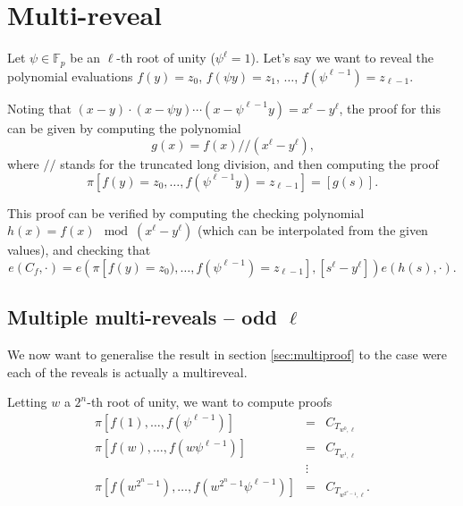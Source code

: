 \documentclass[a4paper]{article}
\begin{document}
\section{Multi-reveal}

Let $\psi\in\mathbb{F}_p$ be an $\ell$-th root of unity ($\psi^\ell=1$). Let's say we want to reveal the polynomial evaluations $f(y) = z_0$, $f(\psi y) = z_1$, $\ldots$, $f(\psi^{\ell-1})=z_{\ell - 1}$.

Noting that $(x-y)\cdot(x-\psi y) \cdots (x - \psi^{\ell-1} y) = x^\ell - y^\ell$, the proof for this can be given by computing the polynomial
\begin{equation}
g(x) = f(x) // (x^\ell - y^\ell)\text{,}
\end{equation}
where $//$ stands for the truncated long division, and then computing the proof
\begin{equation}
     \pi[f(y) = z_0, \ldots, f(\psi^{\ell-1}y)=z_{\ell - 1}] = [g(s)] \text{.}
\end{equation}

This proof can be verified by computing the checking polynomial $h(x) = f(x) \mod (x^\ell - y^\ell)$ (which can be interpolated from the given values), and checking that
\begin{equation}
e(C_f, \cdot) = e(\pi[f(y) = z_0), \ldots, f(\psi^{\ell-1})=z_{\ell - 1}], [s^\ell - y^\ell]) e(h(s),\cdot) \text{.}
\end{equation}

\subsection{Multiple multi-reveals -- odd $\ell$}

We now want to generalise the result in section \ref{sec:multiproof} to the case were each of the reveals is actually a multireveal.

Letting $w$ a $2^n$-th root of unity, we want to compute proofs
\begin{eqnarray}
     \pi[f(1), \ldots, f(\psi^{\ell-1})] &=& C_{T_{w^0, \ell}} \\
     \pi[f(w), \ldots, f(w\psi^{\ell-1})] &=& C_{T_{w^1, \ell}} \\
     &\vdots& \nonumber \\
     \pi[f(w^{2^n-1}), \ldots, f(w^{2^n-1}\psi^{\ell-1})] &=& C_{T_{w^{2^n-1}, \ell}} \text{.}
\end{eqnarray}
\end{document}
